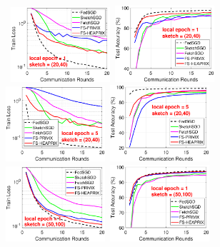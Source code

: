 \documentclass{article} %
\begin{document}
\begin{figure}[t]
	\begin{center}
		\mbox{\hspace{-0.25in}			  
		 \includegraphics[width=1.45in]{MNIST_figures/local1_sketch20_iid1_train_loss.eps} \hspace{-0.12in}
		 \includegraphics[width=1.45in]{MNIST_figures/local1_sketch20_iid1_test_acc.eps} 
		\includegraphics[width=1.45in]{MNIST_figures/local5_sketch20_iid1_train_loss.eps}\hspace{-0.12in}
		\includegraphics[width=1.45in]{MNIST_figures/local5_sketch20_iid1_test_acc.eps}
		}
		\mbox{\hspace{-0.25in}	
		\includegraphics[width=1.45in]{MNIST_figures/local1_sketch50_iid1_train_loss.eps} \hspace{-0.12in}
		\includegraphics[width=1.45in]{MNIST_figures/local1_sketch50_iid1_test_acc.eps} 
}
\end{center}
\end{figure}
\end{document}
